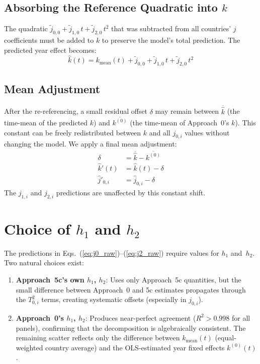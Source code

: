 \documentclass[11pt]{article}
\begin{document}
\subsection{Absorbing the Reference Quadratic into $k$}

The quadratic $\tilde{j}_{0,0} + \tilde{j}_{1,0}\,t + \tilde{j}_{2,0}\,t^2$
that was subtracted from all countries' $j$ coefficients must be added to $k$
to preserve the model's total prediction. The predicted year effect becomes:
\begin{equation}
\hat{k}(t) = k_{\mathrm{mean}}(t) + \tilde{j}_{0,0} + \tilde{j}_{1,0}\,t + \tilde{j}_{2,0}\,t^2
\label{eq:k_adjusted}
\end{equation}

\subsection{Mean Adjustment}

After the re-referencing, a small residual offset $\delta$ may remain between
$\overline{\hat{k}}$ (the time-mean of the predicted $k$) and $\overline{k^{(0)}}$
(the time-mean of Approach~0's $k$). This constant can be freely redistributed
between $k$ and all $j_{0,i}$ values without changing the model.
We apply a final mean adjustment:
\begin{align}
\delta &= \overline{\hat{k}} - \overline{k^{(0)}} \label{eq:delta} \\
\hat{k}'(t) &= \hat{k}(t) - \delta \label{eq:k_final} \\
\hat{j}'_{0,i} &= \hat{j}_{0,i} - \delta \label{eq:j0_final}
\end{align}
The $j_{1,i}$ and $j_{2,i}$ predictions are unaffected by this constant shift.

\section{Choice of $h_1$ and $h_2$}

The predictions in Eqs.~(\ref{eq:j0_raw})--(\ref{eq:j2_raw}) require values for
$h_1$ and~$h_2$. Two natural choices exist:

\begin{enumerate}
\item \textbf{Approach~5c's own $h_1$, $h_2$}: Uses only Approach~5c quantities,
      but the small difference between Approach~0 and 5c estimates propagates through
      the $T_{0,i}^2$ terms, creating systematic offsets (especially in $j_{0,i}$).

\item \textbf{Approach~0's $h_1$, $h_2$}: Produces near-perfect agreement
      ($R^2 > 0.998$ for all panels), confirming that the decomposition is
      algebraically consistent. The remaining scatter reflects only the difference
      between $k_{\mathrm{mean}}(t)$ (equal-weighted country average) and
      the OLS-estimated year fixed effects $k^{(0)}(t)$.
\end{enumerate}
\end{document}
